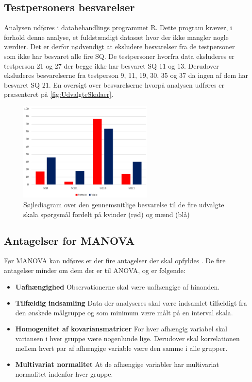 \subsection{Testpersoners besvarelser}
%
Analysen udføres i databehandlings programmet R. Dette program kræver, i forhold denne analyse, et fuldstændigt datasæt hvor der ikke mangler nogle værdier. Det er derfor nødvendigt at eksludere besvarelser fra de testpersoner som ikke har besvaret alle fire SQ. De testpersoner hvorfra data eksluderes er testperson 21 og 27 der begge ikke har besvaret SQ 11 og 13. Derudover eksluderes besvarelserne fra testperson 9, 11, 19, 30, 35 og 37 da ingen af dem har besvaret SQ 21. \blankline
%
En oversigt over besvarelserne hvorpå analysen udføres er præsenteret på \autoref{fig:UdvalgteSkalaer}.
%
\begin{figure}[H]
\centering
\includegraphics[width = 0.6\textwidth]{Figure/DatabehandlingSkalaer/UdvalgteSkalaerKoen} 
\caption{Søjlediagram over den gennemsnitlige besvarelse til de fire udvalgte skala spørgsmål fordelt på kvinder (rød) og mænd (blå) }
\label{fig:UdvalgteSkalaer}
\end{figure}
\noindent
%
\subsection{Antagelser for MANOVA}
Før MANOVA kan udføres er der fire antagelser der skal opfyldes \parencite[s. 717]{FieldMANOVA}. De fire antagelser minder om dem der er til ANOVA, og er følgende: 

\begin{itemize}
	\item \textbf{Uafhængighed} Observationerne skal være uafhængige af hinanden. 
	\item \textbf{Tilfældig indsamling} Data der analyseres skal være indsamlet tilfældigt fra den ønskede målgruppe og som minimum være målt på en interval skala. 
	\item \textbf{Homogenitet af kovariansmatricer} For hver afhængig variabel skal variansen i hver gruppe være nogenlunde lige. Derudover skal korrelationen mellem hvert par af afhængige variable være den samme i alle grupper. 
	\item \textbf{Multivariat normalitet} At de afhængige variabler har multivariat normalitet indenfor hver gruppe. 
\end{itemize}

